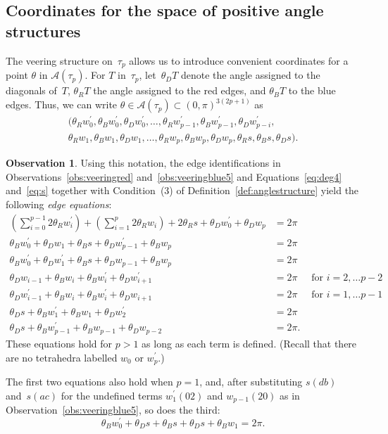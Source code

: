 \documentclass[reqno]{amsart}
\theoremstyle{plain}
\theoremstyle{definition}
\newtheorem{observation}{Observation}
\begin{document}
\subsection{Coordinates for the space of positive angle  structures}\label{sec:coordinates}

The veering structure on~$\tau_{p}$ allows us to introduce convenient coordinates for a point $\theta$ in $\mathcal A(\tau_{p})$.  For $T$ in~$\tau_{p}$, let~$\theta_D T$ denote the angle assigned to the diagonals of~$T$, $\theta_R T$ the angle assigned to the red edges, and $\theta_B T$ to the blue edges.  Thus, we can write $\theta\in\mathcal{A}(\tau_{p})\subset(0,\pi)^{3(2p+1)}$ as
\begin{multline*}
(\theta_R w_0^\prime,
\theta_B w_0^\prime,
\theta_D w_0^\prime,\dots,
\theta_R w_{p-1}^\prime,
\theta_B w_{p-1}^\prime,
\theta_D w_{p-i}^\prime,\\
\theta_R w_1,
\theta_B w_1,
\theta_D w_1,\dots,
\theta_R w_p,
\theta_B w_p,
\theta_D w_p,
\theta_R s,
\theta_B s,
\theta_D s).
\end{multline*}
\begin{observation}\label{obs:edgeeqs}
Using this notation, the edge identifications in Observations~\ref{obs:veeringred} and~\ref{obs:veeringblue5} and Equations~\eqref{eq:deg4} and~\eqref{eq:s} together with Condition~(3) of Definition~\ref{def:anglestructure} yield the following \emph{edge equations}:
\begin{align*}
\left(\sum_{i=0}^{p-1} 2\theta_R w_i^\prime\right) +\left(\sum_{i=1}^{p} 2\theta_R w_i\right) +2\theta_R s + \theta_Dw_0^\prime+\theta_Dw_p&=2\pi\\
\theta_B w_0^\prime+\theta_D w_1+\theta_B s+\theta_D w_{p-1}^\prime+\theta_B w_p&=2\pi\\
\theta_B w_0^\prime+\theta_D w_1^\prime+\theta_B s+\theta_D  w_{p-1}+\theta_B w_p&=2\pi\\
\theta_D w_{i-1}+\theta_B w_{i}+\theta_B w_{i}^\prime+\theta_D  w_{i+1}^\prime&=2\pi&\text{ for } i=2, \dots p-2\\
\theta_D w_{i-1}^\prime+\theta_B w_{i}+\theta_B w_{i}^\prime+\theta_D  w_{i+1}&=2\pi&\text{ for } i=1, \dots p-1\\
\theta_D s+\theta_B w_1^\prime+\theta_B w_1+\theta_D  w_2^\prime&=2\pi\\
\theta_D s+\theta_B w_{p-1}^\prime+\theta_B w_{p-1}+\theta_D  w_{p-2}&=2\pi.
\end{align*}
These equations hold for $p>1$ as long as each term is defined.  (Recall that there are no tetrahedra labelled $w_0$ or $w_p^\prime$.)  

The first two equations also hold when $p=1$, and, after substituting $s(db)$ and~$s(ac)$ for the undefined terms $w_1^\prime(02)$ and $w_{p-1}(20)$ as in Observation~\ref{obs:veeringblue5}, so does the third:
$$
\theta_B w_0^\prime+\theta_D s+\theta_B s+\theta_D  s+\theta_B w_1=2\pi.
$$
\end{observation}
\end{document}
